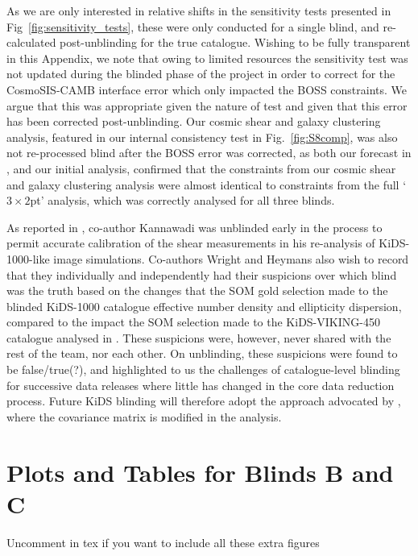 \begin{appendix}
As we are only interested in relative shifts in the sensitivity tests presented in Fig~\ref{fig:sensitivity_tests}, these were only conducted for a single blind, and re-calculated post-unblinding for the true catalogue.  Wishing to be fully transparent in this Appendix, we note that owing to limited resources the sensitivity test was not updated during the blinded phase of the project in order to correct for the {\sc CosmoSIS-CAMB} interface error which only impacted the BOSS constraints.   We argue that this was appropriate given the nature of test and given that this error has been corrected post-unblinding.    Our cosmic shear and galaxy clustering analysis, featured in our internal consistency test in Fig.~\ref{fig:S8comp}, was also not re-processed blind after the BOSS error was corrected, as both our forecast in \citet{joachimi/etal:inprep}, and our initial analysis, confirmed that the constraints from our cosmic shear and galaxy clustering analysis were almost identical to constraints from the full `$3\times2$pt' analysis, which was correctly analysed for all three blinds.

As reported in \citet{giblin/etal:inprep}, co-author Kannawadi was unblinded early in the process to permit accurate calibration of the shear measurements in his re-analysis of KiDS-1000-like image simulations.   Co-authors Wright and Heymans also wish to record that they individually and independently had their suspicions over which blind was the truth based on the changes that the SOM gold selection made to the blinded KiDS-1000 catalogue effective number density and ellipticity dispersion, compared to the impact the SOM selection made to the KiDS-VIKING-450 catalogue analysed in \citet{wright/etal:2020b}.  These suspicions were, however, never shared with the rest of the team, nor each other.   On unblinding, these suspicions were found to be false/true(?),  and highlighted to us the challenges of catalogue-level blinding for successive data releases where little has changed in the core data reduction process.   Future KiDS blinding will therefore adopt the approach advocated by \citet{sellentin:2020}, where the covariance matrix is modified in the analysis.





\section{Plots and Tables for Blinds B and C}
Uncomment in tex if you want to include all these extra figures






\end{appendix}